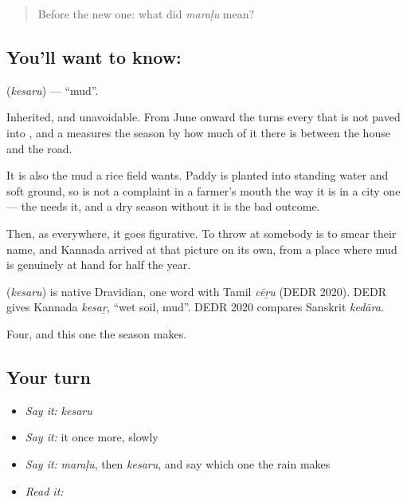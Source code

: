 \label{lesson:KA-C59-mud}



\begin{quote}
Before the new one: what did \emph{maraḷu} mean?
\end{quote}

\subsection*{You'll want to know: }
\textbf{} (\emph{kesaru}) — \textquotedblleft{}mud\textquotedblright{}.

Inherited, and unavoidable. From June onward the  turns every  that is not paved into , and a  measures the season by how much of it there is between the house and the road.

It is also the mud a rice field wants. Paddy is planted into standing water and soft ground, so  is not a complaint in a farmer's mouth the way it is in a city one — the  needs it, and a dry season without it is the bad outcome.

Then, as everywhere, it goes figurative. To throw  at somebody is to smear their name, and Kannada arrived at that picture on its own, from a place where mud is genuinely at hand for half the year.

\begin{cousinweb}
\textbf{} (\emph{kesaru}) is native Dravidian, one word with Tamil \emph{cēṟu} (DEDR 2020). DEDR gives Kannada \emph{kesaṟ}, \textquotedblleft{}wet soil, mud\textquotedblright{}. DEDR 2020 compares Sanskrit \emph{kedāra}.
\end{cousinweb}

\begin{grammarlens}[title={What you've built}]
Four, and this one the season makes.
\end{grammarlens}

\subsection*{Your turn}
\begin{itemize}
\raggedright
  \item \emph{Say it:} \emph{kesaru}
  \item \emph{Say it:} it once more, slowly
  \item \emph{Say it:} \emph{maraḷu}, then \emph{kesaru}, and say which one the rain makes
  \item \emph{Read it:} \textbf{}
\end{itemize}

